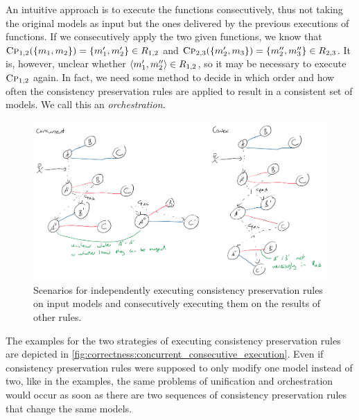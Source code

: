 An intuitive approach is to execute the functions consecutively, thus not taking the original models as input but the ones delivered by the previous executions of functions.
If we consecutively apply the two given functions, we know that $\textsc{Cp}_{1,2}(\{ m_{1}, m_{2} \}) = \{ m'_{1}, m'_{2} \} \in R_{1,2}$ and 
$\textsc{Cp}_{2,3}(\{ m'_{2}, m_{3} \}) = \{ m''_{2}, m''_{3} \} \in R_{2,3}$.
It is, however, unclear whether $\langle m'_{1}, m''_{2} \rangle \in R_{1,2}$, so it may be necessary to execute $\textsc{Cp}_{1,2}$ again.
In fact, we need some method to decide in which order and how often the \glspl{consistency preservation rule} are applied to result in a consistent set of models.
We call this an \emph{orchestration}.

\begin{figure}
    \centering
    \includegraphics[width=\textwidth]{figures/correctness/notion/concurrent_consecutive_execution.png}
    \caption[Execution alternatives of consistency preservation rules]{Scenarios for independently executing consistency preservation rules on input models and consecutively executing them on the results of other rules.}
    \label{fig:correctness:concurrent_consecutive_execution}
\end{figure}

The examples for the two strategies of executing \glspl{consistency preservation rule} are depicted in \autoref{fig:correctness:concurrent_consecutive_execution}. 
Even if \glspl{consistency preservation rule} were supposed to only modify one model instead of two, like in the examples, the same problems of unification and orchestration would occur as soon as there are two sequences of \glspl{consistency preservation rule} that change the same models.

